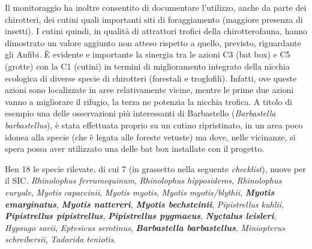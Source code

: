 {Il monitoraggio ha inoltre consentito di documentare l’utilizzo, anche da parte dei chirotteri, dei cutini quali importanti siti di foraggiamento (maggiore presenza di insetti). I cutini quindi, in qualità di attrattori trofici della chirotterofauna, hanno dimostrato un valore aggiunto non atteso rispetto a quello, previsto, riguardante gli Anfibi. È evidente e importante la sinergia tra le azioni C3 (bat box) e C5 (grotte) con la C1 (cutini) in termini di miglioramento integrato della nicchia ecologica di diverse specie di chirotteri (forestali e troglofili). Infatti, ove queste azioni sono localizzate in aree relativamente vicine, mentre le prime due azioni vanno a migliorare il rifugio, la terza ne potenzia la nicchia trofica. A titolo di esempio una delle osservazioni più interessanti di Barbastello (\emph{Barbastella barbastellus}), è stata effettuata proprio su un cutino ripristinato, in un area poco idonea alla specie (che è legata alle foreste vetuste) ma dove, nelle vicinanze, si spera possa aver utilizzato una delle bat box installate con il progetto.

Ben 18 le specie rilevate, di cui 7 (in grassetto nella seguente \textit{checklist}), nuove per il SIC.
\emph{Rhinolophus ferrumequinum}, \emph{Rhinolophus hipposideros}, \emph{Rhinolophus euryale}, \emph{Myotis capaccinii}, \emph{Myotis myotis}, \emph{Myotis myotis/blythii}, \emph{\textbf{Myotis emarginatus}}, \emph{\textbf{Myotis nattereri}}, \emph{\textbf{Myotis bechsteinii}}, \emph{Pipistrellus kuhlii}, \emph{\textbf{Pipistrellus pipistrellus}}, \emph{\textbf{Pipistrellus pygmaeus}}, \emph{\textbf{Nyctalus leisleri}}, \emph{Hypsugo savii}, \emph{Eptesicus serotinus}, \emph{\textbf{Barbastella barbastellus}}, \emph{Miniopterus schreibersii}, \emph{Tadarida teniotis}.
} %